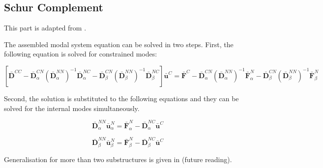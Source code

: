\documentclass[../DomainDecomposition.tex]{subfiles}
\begin{document}
\subsection{Schur Complement} 

This part is adapted from \cite{chatterjee2021multilevel}. 
\vspace{10pt} 

The assembled modal system equation can be solved in two steps. 
First, the following equation is solved for constrained modes: 

\begin{equation}
    \left[
        \bar{\mathbf{D}}^{CC} - 
        \bar{\mathbf{D}}_{\alpha}^{CN} 
        \left(
            \bar{\mathbf{D}}_{\alpha}^{NN} 
        \right)^{-1} 
        \bar{\mathbf{D}}_{\alpha}^{NC} -
        \bar{\mathbf{D}}_{\beta}^{CN} 
        \left(
            \bar{\mathbf{D}}_{\beta}^{NN} 
        \right)^{-1} 
        \bar{\mathbf{D}}_{\beta}^{NC} 
    \right]
    \bar{\mathbf{u}}^{C} 
    =
    \bar{\mathbf{F}}^{C} - 
    \bar{\mathbf{D}}_{\alpha}^{CN} 
    \left(
        \bar{\mathbf{D}}_{\alpha}^{NN} 
    \right)^{-1} 
    \bar{\mathbf{F}}_{\alpha}^{N} - 
    \bar{\mathbf{D}}_{\beta}^{CN} 
    \left(
        \bar{\mathbf{D}}_{\beta}^{NN} 
    \right)^{-1} 
    \bar{\mathbf{F}}_{\beta}^{N}
\end{equation}

Second, the solution is substituted to the following equations and they can be solved for the internal modes simultaneously. 

\begin{equation}
    \bar{\mathbf{D}}_{\alpha}^{NN} 
    \bar{\mathbf{u}}_{\alpha}^{N} 
    =
    \bar{\mathbf{F}}_{\alpha}^{N} - 
    \bar{\mathbf{D}}_{\alpha}^{NC} 
    \bar{\mathbf{u}}^{C} 
\end{equation}

\begin{equation}
    \bar{\mathbf{D}}_{\beta}^{NN} 
    \bar{\mathbf{u}}_{\beta}^{N} 
    =
    \bar{\mathbf{F}}_{\beta}^{N} - 
    \bar{\mathbf{D}}_{\beta}^{NC} 
    \bar{\mathbf{u}}^{C} 
\end{equation}

Generalisation for more than two substructures is given in \cite{chatterjee2020uncertainty} (future reading). 
\end{document}

